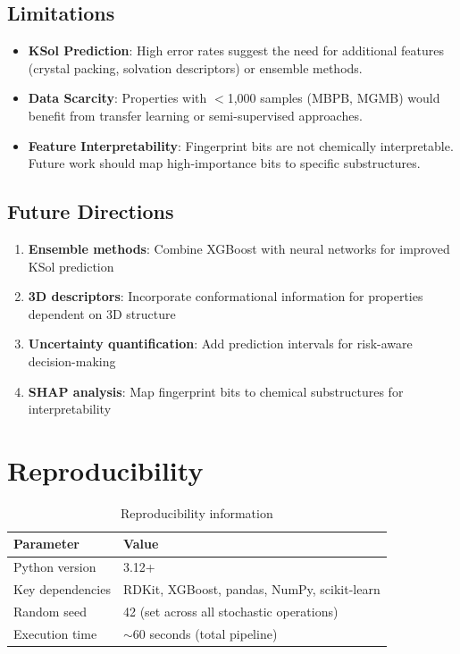 \documentclass[11pt,a4paper]{article}
\newcommand{\xgb}{XGBoost}
\begin{document}
\subsection{Limitations}

\begin{itemize}
    \item \textbf{KSol Prediction}: High error rates suggest the need for additional features (crystal packing, solvation descriptors) or ensemble methods.

    \item \textbf{Data Scarcity}: Properties with $<$1,000 samples (MBPB, MGMB) would benefit from transfer learning or semi-supervised approaches.

    \item \textbf{Feature Interpretability}: Fingerprint bits are not chemically interpretable. Future work should map high-importance bits to specific substructures.
\end{itemize}

\subsection{Future Directions}

\begin{enumerate}
    \item \textbf{Ensemble methods}: Combine \xgb{} with neural networks for improved KSol prediction
    \item \textbf{3D descriptors}: Incorporate conformational information for properties dependent on 3D structure
    \item \textbf{Uncertainty quantification}: Add prediction intervals for risk-aware decision-making
    \item \textbf{SHAP analysis}: Map fingerprint bits to chemical substructures for interpretability
\end{enumerate}

\section{Reproducibility}

\begin{table}[H]
\centering
\caption{Reproducibility information}
\begin{tabular}{ll}
\toprule
\textbf{Parameter} & \textbf{Value} \\
\midrule
Python version & 3.12+ \\
Key dependencies & RDKit, XGBoost, pandas, NumPy, scikit-learn \\
Random seed & 42 (set across all stochastic operations) \\
Execution time & $\sim$60 seconds (total pipeline) \\
\bottomrule
\end{tabular}
\end{table}
\end{document}
